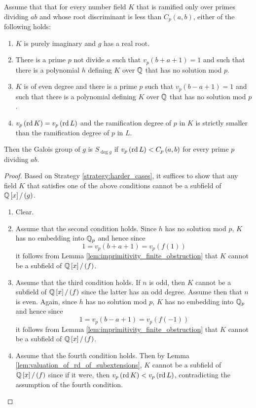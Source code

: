 \documentclass[../main.tex]{subfiles}
\begin{document}
\begin{corollary}
  \label{cor:conditions_that_guarantee_full_galois_group}
  Assume that that for every number field $K$ that is ramified only over primes dividing $a b$ and whose root discriminant is less than $C_p\left( a,b \right)$, either of the following holds:
  \begin{enumerate}
    \item $K$ is purely imaginary and $g$ has a real root.
    \item There is a prime $p$ not divide $a$ such that $v_p\left( b + a + 1 \right) = 1$ and such that there is a polynomial $h$ defining $K$ over $\mathbb{Q}$ that has no solution mod $p$.
    \item $K$ is of even degree and there is a prime $p$ such that $v_p\left( b - a + 1 \right) = 1$ and such that there is a polynomial defining $K$ over $\mathbb{Q}$ that has no solution mod $p$.
    \item $v_p\left( \operatorname{\rm rd} K \right) = v_p\left( \operatorname{\rm rd} L \right)$ and the ramification degree of $p$ in $K$ is strictly smaller than the ramification degree of $p$ in $L$.
  \end{enumerate}
  Then the Galois group of $g$ is $S_{\deg g}$ if $v_p\left( \operatorname{\rm rd} L \right) < C_p\left( a,b \right)$ for every prime $p$ dividing $a b$.
\end{corollary}
\begin{proof}
  Based on Strategy \ref{strategy:harder_cases}, it suffices to show that any field $K$ that satisfies one of the above conditions cannot be a subfield of $\mathbb{Q}\left[ x \right] / \left( g \right)$. 
  \begin{enumerate}
    \item Clear.
    \item Assume that the second condition holds.
    Since $h$ has no solution mod $p$, $K$ has no embedding into $\mathbb{Q}_p$ and hence since 
    \[
      1 = v_p\left( b + a + 1 \right) = v_p\left( f\left( 1 \right) \right)
    \]
    it follows from Lemma \ref{lem:imprimitivity_finite_obstruction} that $K$ cannot be a subfield of $\mathbb{Q}\left[ x \right] / \left( f \right)$. 
    \item Assume that the third condition holds.
    If $n$ is odd, then $K$ cannot be a subfield of $\mathbb{Q}\left[ x \right] / \left( f \right)$ since the latter has an odd degree.
    Assume then that $n$ is even.
    Again, since $h$ has no solution mod $p$, $K$ has no embedding into $\mathbb{Q}_p$ and hence since 
    \[
      1 = v_p\left( b - a + 1 \right) = v_p\left( f\left( -1 \right) \right)
    \]
    it follows from Lemma \ref{lem:imprimitivity_finite_obstruction} that $K$ cannot be a subfield of $\mathbb{Q}\left[ x \right] / \left( f \right)$.
    \item Assume that the fourth condition holds.
    Then by Lemma \ref{lem:valuation_of_rd_of_subextensions}, $K$ cannot be a subfield of $\mathbb{Q}\left[ x \right] / \left( f \right)$ since if it were, then $v_p\left( \operatorname{\rm rd} K \right) < v_p\left( \operatorname{\rm rd} L \right)$, contradicting the assumption of the fourth condition.
  \end{enumerate}
\end{proof}
\end{document}
